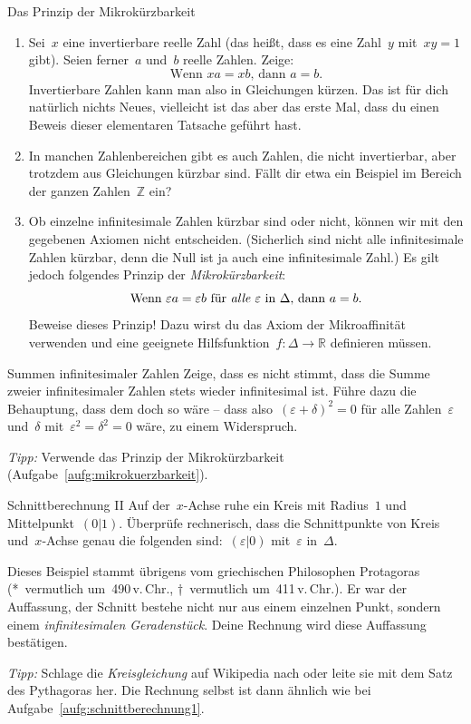 \documentclass{zirkelblatt}
\newcommand{\ZZ}{\mathbb{Z}}
\newcommand{\RR}{\mathbb{R}}
\theoremstyle{definition}
\theoremstyle{plain}
\theoremstyle{remark}
\begin{document}
\begin{aufgabeShaded}{Das Prinzip der Mikrokürzbarkeit}
\label{aufg:mikrokuerzbarkeit}
\begin{enumerate}
\item Sei~$x$ eine invertierbare reelle Zahl (das heißt, dass es eine Zahl~$y$
mit~$xy = 1$ gibt). Seien ferner~$a$ und~$b$ reelle Zahlen. Zeige:
\[ \text{Wenn $xa = xb$, dann $a = b$.} \]
Invertierbare Zahlen kann man also in Gleichungen kürzen. Das ist für dich
natürlich nichts Neues, vielleicht ist das aber das erste Mal, dass du einen
Beweis dieser elementaren Tatsache geführt hast.

\item In manchen Zahlenbereichen gibt es auch Zahlen, die nicht invertierbar,
aber trotzdem aus Gleichungen kürzbar sind. Fällt dir etwa ein Beispiel im
Bereich der ganzen Zahlen~$\ZZ$ ein?

\item Ob einzelne infinitesimale Zahlen kürzbar sind oder nicht, können wir mit
den gegebenen Axiomen nicht entscheiden. (Sicherlich sind nicht alle
infinitesimale Zahlen kürzbar, denn die Null ist ja auch eine infinitesimale
Zahl.) Es gilt jedoch folgendes Prinzip der \emph{Mikrokürzbarkeit}:
\[ \text{Wenn~$\varepsilon a = \varepsilon b$ für \emph{alle} $\varepsilon$
in~$\Delta$, dann $a = b$.} \]
Beweise dieses Prinzip! Dazu wirst du das Axiom der Mikroaffinität verwenden
und eine geeignete Hilfsfunktion~$f : \Delta \to \RR$ definieren müssen.
\end{enumerate}
\end{aufgabeShaded}

\newpage
\begin{aufgabeShaded}{Summen infinitesimaler Zahlen}
Zeige, dass es nicht stimmt, dass die Summe zweier infinitesimaler Zahlen
stets wieder infinitesimal ist. Führe dazu die Behauptung, dass dem doch so wäre --
dass also~$(\varepsilon + \delta)^2 = 0$ für alle Zahlen~$\varepsilon$
und~$\delta$ mit~$\varepsilon^2 = \delta^2 = 0$ wäre, zu einem Widerspruch.

\emph{Tipp:} Verwende das Prinzip der Mikrokürzbarkeit
(Aufgabe~\ref{aufg:mikrokuerzbarkeit}).
\end{aufgabeShaded}

\begin{aufgabeShaded}{Schnittberechnung II}
Auf der~$x$-Achse ruhe ein Kreis mit Radius~$1$ und Mittelpunkt~$(0|1)$.
Überprüfe rechnerisch, dass die Schnittpunkte von Kreis und~$x$-Achse genau die
folgenden sind:~$(\varepsilon|0)$ mit~$\varepsilon$ in~$\Delta$.

Dieses Beispiel stammt übrigens vom griechischen Philosophen Protagoras
(*~vermutlich um~490\,v.\,Chr., †~vermutlich um~411\,v.\,Chr.). Er
war der Auffassung, der Schnitt bestehe nicht nur aus einem einzelnen Punkt,
sondern einem \emph{infinitesimalen Geradenstück}. Deine Rechnung wird diese
Auffassung bestätigen.

\emph{Tipp:} Schlage die \emph{Kreisgleichung} auf Wikipedia nach oder leite
sie mit dem Satz des Pythagoras her. Die Rechnung selbst ist dann ähnlich wie
bei Aufgabe~\ref{aufg:schnittberechnung1}.
\end{aufgabeShaded}
\end{document}
